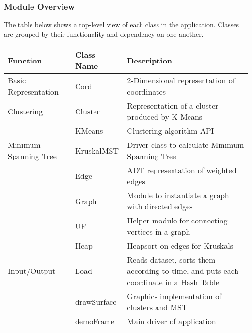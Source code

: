 \documentclass[12pt]{article}
\begin{document}
\subsubsection{Module Overview}
The table below shows a top-level view of each class in the application. Classes are grouped
by their functionality and dependency on one another.
\begin{table}[h]
\begin{tabularx}{\textwidth}{|l|X|X|}
\hline
Function & Class Name & Description\\
\hline
Basic Representation & Cord & 2-Dimensional representation of coordinates\\
\hline
Clustering & Cluster & Representation of a cluster produced by K-Means\\
\cline{2-3}
~ & KMeans & Clustering algorithm API\\
\hline
Minimum Spanning Tree & KruskalMST & Driver class to calculate Minimum
                                     Spanning Tree\\
\cline{2-3}
~ & Edge & ADT representation of weighted edges\\
\cline{2-3}
~ & Graph & Module to instantiate a graph with directed edges\\
\cline{2-3}
~ & UF & Helper module for connecting vertices in a graph\\
\cline{2-3}
~ & Heap & Heapsort on edges for Kruskals\\
\hline
Input/Output & Load & Reads dataset, sorts them according to time,
                      and puts each coordinate in a Hash Table\\
\cline{2-3}
~ & drawSurface & Graphics implementation of clusters and MST\\
\cline{2-3}
~ & demoFrame & Main driver of application\\
\hline
\end{tabularx}
\end{table}

\newpage
\end{document}
